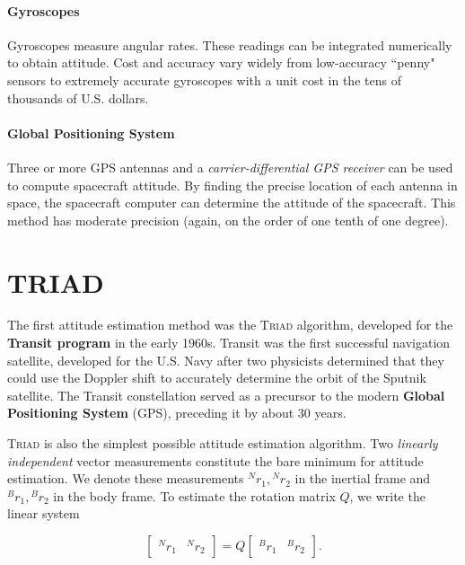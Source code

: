 \documentclass[12pt]{article}
\begin{document}
	\paragraph{Gyroscopes} Gyroscopes measure angular rates.  These readings can be integrated numerically to obtain attitude.  Cost and accuracy vary widely from low-accuracy ``penny" sensors to extremely accurate gyroscopes with a unit cost in the tens of thousands of U.S. dollars.
	
	\paragraph{Global Positioning System} Three or more GPS antennas and a \textit{carrier-differential GPS receiver} can be used to compute spacecraft attitude.  By finding the precise location of each antenna in space, the spacecraft computer can determine the attitude of the spacecraft.  This method has moderate precision (again, on the order of one tenth of one degree).
	
	\section{TRIAD}
	
	The first attitude estimation method was the \textsc{Triad} algorithm, developed for the \textbf{Transit program} in the early 1960s.  Transit was the first successful navigation satellite, developed for the U.S. Navy after two physicists determined that they could use the Doppler shift to accurately determine the orbit of the Sputnik satellite.  The Transit constellation served as a precursor to the modern \textbf{Global Positioning System} (GPS), preceding it by about 30 years.
	
	\textsc{Triad} is also the simplest possible attitude estimation algorithm.  Two \textit{linearly independent} vector measurements constitute the bare minimum for attitude estimation.  We denote these measurements \( {}^N r_1, {}^N r_2 \) in the inertial frame and \( {}^B r_1, {}^B r_2 \) in the body frame.  To estimate the rotation matrix \( Q \), we write the linear system
	
	\begin{equation*}
		\begin{bmatrix}
			{}^N r_1 & {}^N r_2
		\end{bmatrix}
		=
		Q
		\begin{bmatrix}
			{}^B r_1 & {}^B r_2
		\end{bmatrix} .
	\end{equation*}
	
\end{document}
